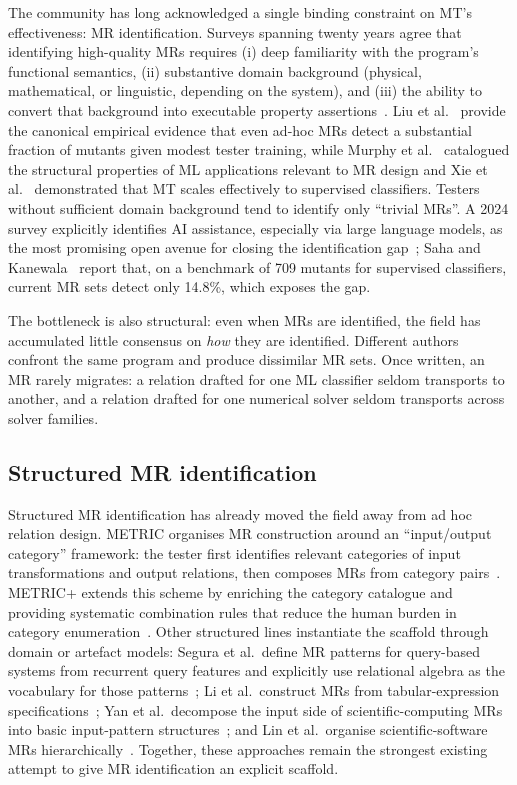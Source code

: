 \documentclass[acmsmall,screen,anonymous,review]{acmart}
\begin{document}
The community has long acknowledged a single binding constraint on MT's effectiveness: MR identification. Surveys spanning twenty years agree that identifying high-quality MRs requires (i) deep familiarity with the program's functional semantics, (ii) substantive domain background (physical, mathematical, or linguistic, depending on the system), and (iii) the ability to convert that background into executable property assertions~\cite{Segura2016, LiTOSEM2025}. Liu et al.~\cite{Liu2014MTEffectiveness} provide the canonical empirical evidence that even ad-hoc MRs detect a substantial fraction of mutants given modest tester training, while Murphy et al.~\cite{Murphy2008} catalogued the structural properties of ML applications relevant to MR design and Xie et al.~\cite{Xie2011} demonstrated that MT scales effectively to supervised classifiers. Testers without sufficient domain background tend to identify only ``trivial MRs''. A 2024 survey explicitly identifies AI assistance, especially via large language models, as the most promising open avenue for closing the identification gap~\cite{LiTOSEM2025}; Saha and Kanewala~\cite{Saha2019SupervisedMR} report that, on a benchmark of 709 mutants for supervised classifiers, current MR sets detect only 14.8\%, which exposes the gap.

The bottleneck is also structural: even when MRs are identified, the field has accumulated little consensus on \emph{how} they are identified. Different authors confront the same program and produce dissimilar MR sets. Once written, an MR rarely migrates: a relation drafted for one ML classifier seldom transports to another, and a relation drafted for one numerical solver seldom transports across solver families.

\subsection{Structured MR identification}

Structured MR identification has already moved the field away from ad hoc relation design. METRIC organises MR construction around an ``input/output category'' framework: the tester first identifies relevant categories of input transformations and output relations, then composes MRs from category pairs~\cite{ChenMETRIC2016}. METRIC+ extends this scheme by enriching the category catalogue and providing systematic combination rules that reduce the human burden in category enumeration~\cite{SunMETRICplus2021}. Other structured lines instantiate the scaffold through domain or artefact models: Segura et al.\ define MR patterns for query-based systems from recurrent query features and explicitly use relational algebra as the vocabulary for those patterns~\cite{Segura2019QBSMRPatterns}; Li et al.\ construct MRs from tabular-expression specifications~\cite{Li2020TabularMR}; Yan et al.\ decompose the input side of scientific-computing MRs into basic input-pattern structures~\cite{Yan2022InputPattern}; and Lin et al.\ organise scientific-software MRs hierarchically~\cite{Lin2018HierarchicalMR}. Together, these approaches remain the strongest existing attempt to give MR identification an explicit scaffold.
\end{document}
